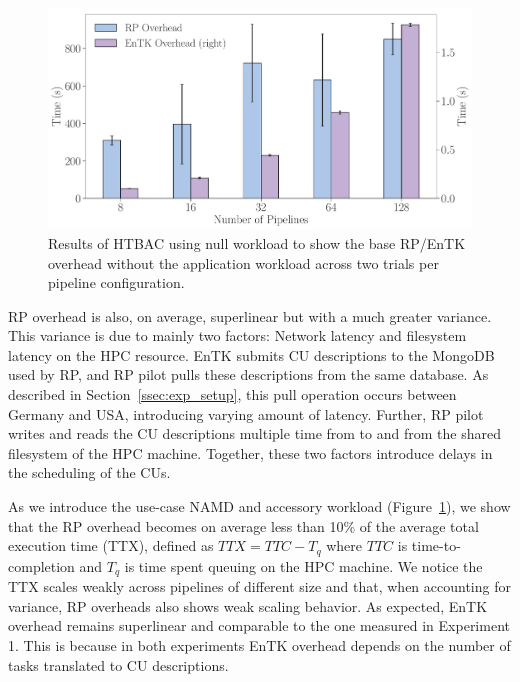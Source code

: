 \begin{figure}
  \centering
  \includegraphics[width=\columnwidth]{FIGURES/null_workload_overheads.pdf}
  \caption{Results of HTBAC using null workload to show the base RP/EnTK overhead without the application workload across two trials per pipeline configuration.}\label{fig:exp1}
\end{figure}


RP overhead is also, on average, superlinear but with a much greater
variance. This variance is due to mainly two factors: Network latency and
filesystem latency on the HPC resource. EnTK submits CU descriptions to the
MongoDB used by RP, and RP pilot pulls these descriptions from the same
database. As described in Section~\ref{ssec:exp_setup}, this pull operation
occurs between Germany and USA, introducing varying amount of latency.
Further, RP pilot writes and reads the CU descriptions multiple time from to
and from the shared filesystem of the HPC machine. Together, these two
factors introduce delays in the scheduling of the CUs.


As we introduce the use-case NAMD and accessory workload
(Figure~\ref{fig:exp1}), we show that the RP overhead becomes
on average less than 10\% of the average total execution time (TTX), defined 
as \(TTX = TTC - T_q\) where \(TTC\) is time-to-completion and \(T_q\)
is time spent queuing on the HPC machine. We notice the TTX scales weakly
across pipelines of different size and that, when accounting for variance, RP
overheads also shows weak scaling behavior. As expected, EnTK overhead
remains superlinear and comparable to the one measured in Experiment 1. This
is because in both experiments EnTK overhead depends on the number of tasks
translated to CU descriptions.

